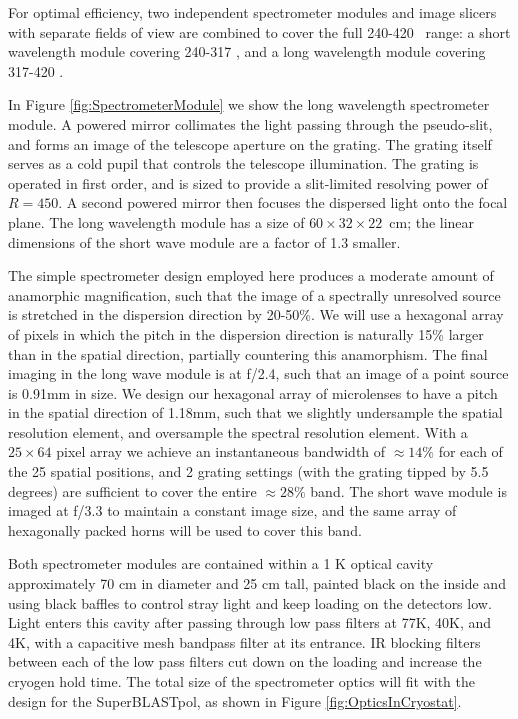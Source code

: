 For optimal efficiency, two independent spectrometer modules and image slicers with separate fields of view are combined to cover the full 240-420 \mum\ range: a short wavelength module covering 240-317 \mum, and a long wavelength module covering 317-420 \mum. 

In Figure \ref{fig:SpectrometerModule} we show the long wavelength spectrometer module. A powered mirror collimates the light passing through the pseudo-slit, and forms an image of the telescope aperture on the grating. The grating itself serves as a cold pupil that controls the telescope illumination. The grating is
operated in first order, and is sized to provide a slit-limited resolving power of $R=450$. A second powered mirror then focuses the dispersed light onto the focal plane. The long wavelength module has a size of $60 \times 32 \times 22$~cm; the linear dimensions of the short wave module are a factor of 1.3 smaller.

The simple spectrometer design employed here produces a moderate amount of
anamorphic magnification, such that the image of a spectrally unresolved
source is stretched in the dispersion direction by 20-50\%. We will use a
hexagonal array of pixels in which the pitch in the dispersion direction
is naturally 15\% larger than in the spatial direction, partially
countering this anamorphism. The final imaging in the long wave module is
at f/2.4, such that an image of a point source is 0.91mm in size. We
design our hexagonal array of microlenses to have a pitch in the spatial
direction of 1.18mm, such that we slightly undersample the spatial
resolution element, and oversample the spectral resolution element. With a
$25\times64$ pixel array we achieve an instantaneous bandwidth of $\approx$$14\%$
for each of the 25 spatial positions, and 2 grating settings (with the
grating tipped by 5.5 degrees) are sufficient to cover the entire
$\approx$$28\%$ band. The short wave module is imaged at f/3.3 to maintain
a constant image size, and the same array of hexagonally packed horns
will be used to cover this band.
 
Both spectrometer modules are contained within a 1 K optical cavity approximately 70 cm in diameter and 25 cm tall, painted black on the inside and using black baffles to control stray light and keep loading on the detectors low. Light enters this cavity after passing through low pass filters at 77K, 40K, and 4K, with a capacitive mesh bandpass filter at its entrance.  IR blocking
filters between each of the low pass filters cut down on the loading
and increase the cryogen hold time.  The total size of the spectrometer optics will fit with the design for the SuperBLASTpol, as shown in Figure \ref{fig:OpticsInCryostat}.

